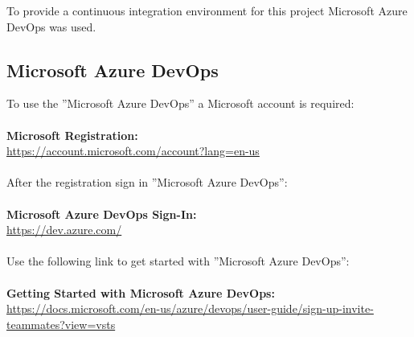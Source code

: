 
To provide a continuous integration environment for this project Microsoft Azure DevOps was used.
\thispagestyle{plain}
\renewcommand\section{\stdsection}
\setcounter{section}{3}
\subsection{Microsoft Azure DevOps}
To use the ''Microsoft Azure DevOps'' a Microsoft account is required:
\\\\
\textbf{Microsoft Registration:} 
\\
\url{https://account.microsoft.com/account?lang=en-us}
\\\\
After the registration sign in ''Microsoft Azure DevOps'':
\\\\
\textbf{Microsoft Azure DevOps Sign-In:} 
\\
\url{https://dev.azure.com/}
\\\\
Use the following link to get started with ''Microsoft Azure DevOps'':
\\\\
\textbf{Getting Started with Microsoft Azure DevOps:} 
\\
\url{https://docs.microsoft.com/en-us/azure/devops/user-guide/sign-up-invite-teammates?view=vsts}

